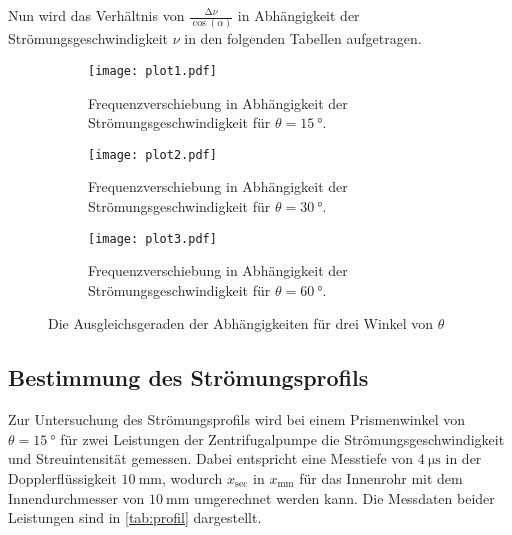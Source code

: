 Nun wird das Verhältnis von $\frac{\increment \nu}{\cos (\alpha)}$ in Abhängigkeit der Strömungsgeschwindigkeit
$\nu$ in den folgenden Tabellen aufgetragen.
\begin{figure}
  \centering
  
  \begin{subfigure}{0.65\columnwidth}
    \centering
    \texttt{[image: plot1.pdf]}
    \caption{Frequenzverschiebung in Abhängigkeit der Strömungsgeschwindigkeit für $\theta = \qty{15}{°}$.}
    \label{fig:w15}
  \end{subfigure}
  
  \medskip
  
  \begin{subfigure}{0.65\columnwidth}
    \centering
    \texttt{[image: plot2.pdf]}
    \caption{Frequenzverschiebung in Abhängigkeit der Strömungsgeschwindigkeit für $\theta = \qty{30}{°}$.}
    \label{fig:w30}
  \end{subfigure}
  
  \medskip
  
  \begin{subfigure}{0.65\columnwidth}
    \centering
    \texttt{[image: plot3.pdf]}
    \caption{Frequenzverschiebung in Abhängigkeit der Strömungsgeschwindigkeit für $\theta = \qty{60}{°}$.}
    \label{fig:w60}
  \end{subfigure}

  \caption{Die Ausgleichsgeraden der Abhängigkeiten für drei Winkel von $\theta$}
  \label{fig:winkel}
\end{figure}


\subsection{Bestimmung des Strömungsprofils}

Zur Untersuchung des Strömungsprofils wird bei einem Prismenwinkel von $\theta = \qty{15}{°}$
für zwei Leistungen der Zentrifugalpumpe die Strömungsgeschwindigkeit und Streuintensität gemessen.
Dabei entspricht eine Messtiefe von $\qty{4}{\micro\second}$ in der Dopplerflüssigkeit $\qty{10}{\milli\meter}$, 
wodurch $x_\text{sec}$ in $x_\text{mm}$ für das Innenrohr mit dem Innendurchmesser von $\qty{10}{\milli\meter}$ umgerechnet werden kann. 
Die Messdaten beider Leistungen sind in \autoref{tab:profil} dargestellt.

